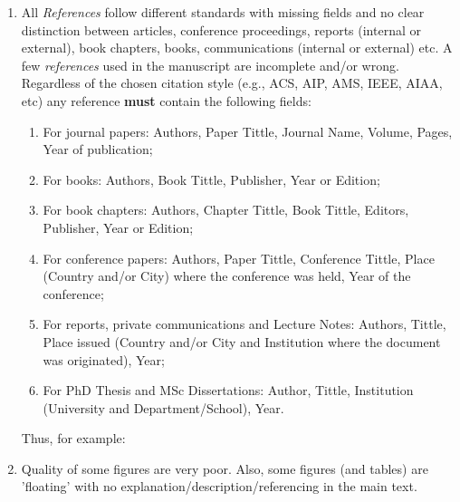 \documentclass[14pt,twoside]{report}
\begin{document}
\begin{enumerate}
%
\item All {\it References} follow different standards with missing fields and no clear distinction between articles, conference proceedings, reports (internal or external), book chapters, books, communications (internal or external) etc.  A few {\it references} used in the manuscript are incomplete and/or wrong. Regardless of the chosen citation style (e.g., ACS, AIP, AMS, IEEE, AIAA, etc) any reference {\bf must} contain the following fields: 
\begin{enumerate}
\item For journal papers: Authors, Paper Tittle, Journal Name, Volume, Pages, Year of publication;
\item For books: Authors, Book Tittle, Publisher, Year or Edition;
\item For book chapters: Authors, Chapter Tittle, Book Tittle, Editors, Publisher, Year or Edition;
\item For conference papers: Authors, Paper Tittle, Conference Tittle, Place (Country and/or City) where the conference was held, Year of the conference;
\item For reports,  private communications and Lecture Notes: Authors, Tittle, Place issued (Country and/or City and Institution where the document was originated), Year;
\item For PhD Thesis and MSc Dissertations: Author, Tittle, Institution (University and Department/School), Year.
\end{enumerate}  
Thus, for example:
%
\item Quality of some figures are very poor. Also, some figures (and  tables) are 'floating' with no explanation/description/referencing in the main text.

\end{enumerate}
\end{document}
